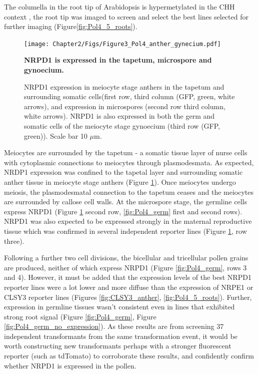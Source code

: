 The columella in the root tip of Arabidopsis is hypermetylated in the CHH context \citep{RN261}, the root tip was imaged to screen and select the best lines selected for further imaging (Figure\ref{fig:Pol4_5_roots}).

\begin{figure}[htbp!] 
\centering    
    \texttt{[image: Chapter2/Figs/Figure3\_Pol4\_anther\_gynecium.pdf]}
\caption{\textbf{NRPD1 is expressed in the tapetum, microspore and gynoecium.}}
\label{fig:Pol4_anther}
\captionsetup{font=small}
    \caption*{NRPD1 expression in meiocyte stage anthers in the tapetum and surrounding somatic cells(first row, third column (GFP, green, white arrows), and expression in microspores (second row third column, white arrows). NRPD1 is also expressed in both the germ and somatic cells of the meiocyte stage gynoecium (third row (GFP, green)). Scale bar 10 $\mu$m.}
\end{figure}

Meiocytes are surrounded by the tapetum - a somatic tissue layer of nurse cells with cytoplasmic connections to meiocytes through plasmodesmata. As expected, NRDP1 expression was confined to the tapetal layer and surrounding somatic anther tissue in meiocyte stage anthers (Figure \ref{fig:Pol4_anther}). Once meiocytes undergo meiosis, the plasmodesmatal connection to the tapetum ceases and the meiocytes are surrounded by callose cell walls. At the microspore stage, the germline cells express NRPD1 (Figure \ref{fig:Pol4_anther} second row, \ref{fig:Pol4_germ} first and second rows). NRPD1 was also expected to be expressed strongly in the maternal reproductive tissue \citep{RN165} which was confirmed in several independent reporter lines (Figure \ref{fig:Pol4_anther}, row three).

Following a further two cell divisions, the bicellular and tricellular pollen grains are produced, neither of which express NRPD1 (Figure \ref{fig:Pol4_germ}, rows 3 and 4). However, it must be added that the expression levels of the best NRPD1 reporter lines were a lot lower and more diffuse than the expression of NRPE1 or CLSY3 reporter lines (Figures \ref{fig:CLSY3_anther}, \ref{fig:Pol4_5_roots}). Further, expression in germline tissues wasn't consistent even in lines that exhibited strong root signal (Figure \ref{fig:Pol4_germ}, Figure \ref{fig:Pol4_germ_no_expression}). As these results are from screening 37 independent transformants from the same transformation event, it would be worth constructing new transformants perhaps with a stronger fluorescent reporter (such as tdTomato) to corroborate these results, and confidently confirm whether NRPD1 is expressed in the pollen. 


